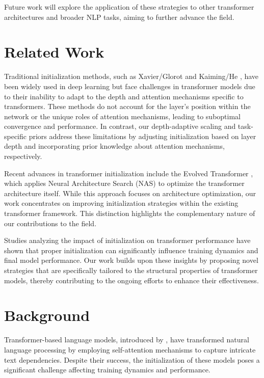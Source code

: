 \documentclass{article} %
\begin{document}
Future work will explore the application of these strategies to other transformer architectures and broader NLP tasks, aiming to further advance the field.

\section{Related Work}
\label{sec:related}
Traditional initialization methods, such as Xavier/Glorot \cite{Datta2020ASO} and Kaiming/He \cite{Andiani2021KlasifikasiCH}, have been widely used in deep learning but face challenges in transformer models due to their inability to adapt to the depth and attention mechanisms specific to transformers. These methods do not account for the layer's position within the network or the unique roles of attention mechanisms, leading to suboptimal convergence and performance. In contrast, our depth-adaptive scaling and task-specific priors address these limitations by adjusting initialization based on layer depth and incorporating prior knowledge about attention mechanisms, respectively.

Recent advances in transformer initialization include the Evolved Transformer \cite{So2019TheET}, which applies Neural Architecture Search (NAS) to optimize the transformer architecture itself. While this approach focuses on architecture optimization, our work concentrates on improving initialization strategies within the existing transformer framework. This distinction highlights the complementary nature of our contributions to the field.

Studies analyzing the impact of initialization on transformer performance \cite{Wang2022TransformerEmpowered6I} have shown that proper initialization can significantly influence training dynamics and final model performance. Our work builds upon these insights by proposing novel strategies that are specifically tailored to the structural properties of transformer models, thereby contributing to the ongoing efforts to enhance their effectiveness.

\section{Background}
\label{sec:background}
Transformer-based language models, introduced by \citet{vaswani2017attention}, have transformed natural language processing by employing self-attention mechanisms to capture intricate text dependencies. Despite their success, the initialization of these models poses a significant challenge affecting training dynamics and performance.
\end{document}
